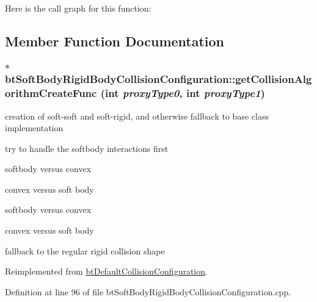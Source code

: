 Here is the call graph for this function:

\subsection{Member Function Documentation}
\hypertarget{classbt_soft_body_rigid_body_collision_configuration_81be88bc433469b4703fc0fb9d504a50}{
\subsubsection[getCollisionAlgorithmCreateFunc]{ $\ast$ btSoftBodyRigidBodyCollisionConfiguration::getCollisionAlgorithmCreateFunc (int {\em proxyType0}, \/  int {\em proxyType1})}}
\label{classbt_soft_body_rigid_body_collision_configuration_81be88bc433469b4703fc0fb9d504a50}


creation of soft-soft and soft-rigid, and otherwise fallback to base class implementation 



try to handle the softbody interactions first

softbody versus convex

convex versus soft body

softbody versus convex

convex versus soft body

fallback to the regular rigid collision shape 

Reimplemented from \hyperlink{classbt_default_collision_configuration}{btDefaultCollisionConfiguration}.

Definition at line 96 of file btSoftBodyRigidBodyCollisionConfiguration.cpp.

